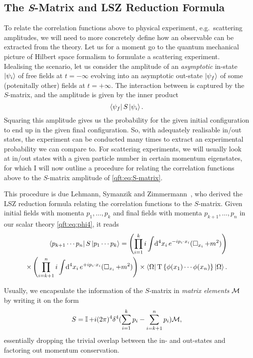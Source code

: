 \documentclass[../main.tex]{subfiles}
\begin{document}
\subsection{The \textit{S}-Matrix and LSZ Reduction Formula}
To relate the correlation functions above to physical experiment, e.g.\ scattering amplitudes, we will need to more concretely define how an observable can be extracted from the theory.
Let us for a moment go to the quantum mechanical picture of Hilbert space formalism to formulate a scattering experiment.
Idealising the scenario, let us consider the amplitude of an \emph{asymptotic} in-state \(\left| \psi_i \right\rangle\) of free fields at \(t=-\infty\) evolving into an asymptotic out-state \(\left| \psi_f \right\rangle\) of some (potenitally other) fields at \(t=+\infty\).
The interaction between is captured by the \(S\)-matrix, and the amplitude is given by the inner product
\begin{equation}
  \label{qft:eq:S-matrix}
  \left\langle \psi_f \right| S \left| \psi_i \right\rangle.
\end{equation}
Squaring this amplitude gives us the probability for the given initial configuration to end up in the given final configuration.
So, with adequately realisable in/out states, the experiment can be conducted many times to extract an experimental probability we can compare to.
For scattering experiments, we will usually look at in/out states with a given particle number in certain momentum eigenstates, for which I will now outline a procedure for relating the correlation functions above to the \(S\)-matrix amplitude of \cref{qft:eq:S-matrix}.

This procedure is due Lehmann, Symanzik and Zimmermann~\cite{LSZ}, who derived the LSZ reduction formula relating the correlation functions to the \(S\)-matrix.
Given initial fields with momenta \(p_1, \ldots, p_k\) and final fields with momenta \(p_{k+1}, \ldots, p_n\) in our scalar theory \cref{qft:eq:phi4}, it reads~\cite{Schwartz:2014sze}
\begin{align}
  \label{qft:eq:LSZ_S-matrix}
  \nonumber
  \left\langle p_{k+1}\cdots p_n \right| S \left| p_1 \cdots p_k \right\rangle = \left(\prod_{i=1}^k i \int \!\mathrm{d}^4x_i\, e^{-ip_i \cdot x_i} (\operatorname{\Box}_{x_i} + m^2)\right) \\
  \times \left(\prod_{i=k+1}^n i \int \!\mathrm{d}^4x_i\, e^{+ip_i \cdot x_i} (\operatorname{\Box}_{x_i} + m^2)\right)
  \times \left\langle \Omega \right| \operatorname{T}\left\{\phi(x_1)\cdots \phi(x_n)\right\} \left| \Omega \right\rangle.
\end{align}

Usually, we encapsulate the information of the \(S\)-matrix in \emph{matrix elements} \(\mathcal{M}\) by writing it on the form
\begin{equation}
  \label{qft:eq:S-matrix_expansion}
  S = \operatorname{\mathbb{I}} + i(2\pi)^4 \delta^4(\sum_{i=1}^k p_i - \sum_{i=k+1}^n p_i) \mathcal{M},
\end{equation}
essentially dropping the trivial overlap between the in- and out-states and factoring out momentum conservation.
\medskip
\end{document}
